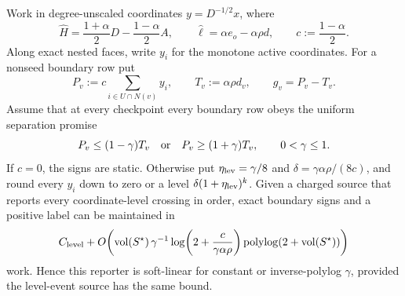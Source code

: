 \begin{proposition}
\label{prop:aesp-cd-separated-level-reporter}
Work in degree-unscaled coordinates $y=D^{-1/2}x$, where
\begin{equation*}
 \widehat H=\frac{1+\alpha}{2}D-\frac{1-\alpha}{2}A,\qquad
 \widehat\ell=\alpha e_o-\alpha\rho d,\qquad
 c:=\frac{1-\alpha}{2}.
\end{equation*}
Along exact nested faces, write $y_i$ for the monotone active coordinates.
For a nonseed boundary row put
\begin{equation*}
 P_v:=c\sum_{i\in U\cap N(v)}y_i,\qquad
 T_v:=\alpha\rho d_v,\qquad g_v=P_v-T_v.
\end{equation*}
Assume that at every checkpoint every boundary row obeys the uniform
separation promise
\begin{equation}
 P_v\leq(1-\gamma)T_v
 \quad\hbox{or}\quad
 P_v\geq(1+\gamma)T_v,\qquad 0<\gamma\leq1.
 \label{eq:aesp-cd-separated-level-margin}
\end{equation}
If $c=0$, the signs are static.  Otherwise put
$\eta_{\rm lev}=\gamma/8$ and $\delta=\gamma\alpha\rho/(8c)$, and round every
$y_i$ down to zero or a level $\delta(1+\eta_{\rm lev})^k$.  Given a charged source
that reports every coordinate-level crossing in order, exact boundary signs
and a positive label can be maintained in
\begin{equation}
 C_{\rm level}+
 O\!\left(
  \operatorname{vol}(S^\star)\,\gamma^{-1}
  \log\!\left(2+\frac{c}{\gamma\alpha\rho}\right)
  \operatorname{polylog}(2+\operatorname{vol}(S^\star))
 \right)
 \label{eq:aesp-cd-separated-level-work}
\end{equation}
work.  Hence this reporter is soft-linear for constant or inverse-polylog
$\gamma$, provided the level-event source has the same bound.
\end{proposition}

